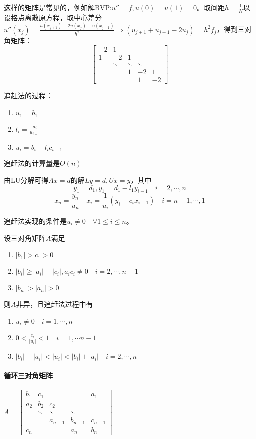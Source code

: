 \documentclass{ctexart}
\begin{document}
这样的矩阵是常见的，例如解BVP:$u''=f,u(0)=u(1)=0$。取间距$h=\frac{1}{N}$以设格点离散原方程，取中心差分$u''(x_j)=\frac{u(x_{j+1})-2u(x_j)+u(x_{j-1})}{h^2}\Rightarrow (u_{j+1}+u_{j-1}-2u_j)=h^2f_j$，得到三对角矩阵：
\[\begin{bmatrix}
-2&1&&&\\
1&-2&1&&\\
&\ddots&\ddots&\ddots&\\
&&1&-2&1\\
&&&1&-2
\end{bmatrix}\]

追赶法的过程：
\begin{enumerate}
\item $u_1=b_1$
\item $l_i=\frac{a_i}{u_{i-1}}$
\item $u_i=b_i-l_ic_{i-1}$
\end{enumerate}

追赶法的计算量是$O(n)$


由LU分解可得$Ax=d$的解$Ly=d,Ux=y$，其中
\[y_1=d_1,y_1=d_1-l_1y_{i-1}\quad i=2,\cdots,n\]
\[x_n=\frac{y_n}{u_n}\quad x_i=\frac{1}{u_i}(y_i-c_ix_{i+1})\quad i=n-1,\cdots,1\]

追赶法实现的条件是$u_i\neq 0\quad \forall 1\leq i\leq n$。
\begin{Thm}[追赶法成立的充分条件]
设三对角矩阵$A$满足
\begin{enumerate}
\item $|b_1|>c_1>0$
\item $|b_i|\geq |a_{i}|+|c_i|,a_ic_i\neq 0\quad i=2,\cdots,n-1$
\item $|b_n|>|a_n|>0$
\end{enumerate}
则$A$非异，且追赶法过程中有
\begin{enumerate}
\item $u_i\neq 0\quad i=1,\cdots,n$
\item $0<\frac{|c_i|}{|u_i|}<1\quad i=1,\cdots n-1$
\item $|b_i|-|a_i|<|u_i|<|b_i|+|a_i|\quad i=2,\cdots,n$
\end{enumerate}
\end{Thm}

\paragraph{循环三对角矩阵}$A=
\begin{bmatrix}
b_1&c_1&&&a_1\\
a_2&b_2&c_2&&\\
&\ddots&\ddots&\ddots&\\
&&a_{n-1}&b_{n-1}&c_{n-1}\\
c_n&&&a_n&b_n
\end{bmatrix}$
\end{document}
